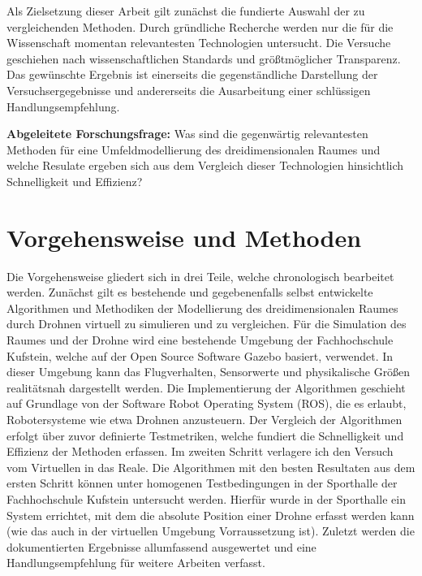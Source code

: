 Als Zielsetzung dieser Arbeit gilt zunächst die fundierte Auswahl der zu vergleichenden Methoden. Durch gründliche Recherche werden nur die für die Wissenschaft momentan relevantesten Technologien untersucht. Die Versuche geschiehen nach wissenschaftlichen Standards und größtmöglicher Transparenz. \newline
Das gewünschte Ergebnis ist einerseits die gegenständliche Darstellung der Versuchsergegebnisse und andererseits die Ausarbeitung einer schlüssigen Handlungsempfehlung. 

    \textbf{Abgeleitete Forschungsfrage:} Was sind die gegenwärtig relevantesten Methoden für eine Umfeldmodellierung des dreidimensionalen Raumes und welche Resulate ergeben sich aus dem Vergleich dieser Technologien hinsichtlich Schnelligkeit und Effizienz?



    \section{Vorgehensweise und Methoden}

Die Vorgehensweise gliedert sich in drei Teile, welche chronologisch bearbeitet werden. \newline
Zunächst gilt es bestehende und gegebenenfalls selbst entwickelte Algorithmen und Methodiken der Modellierung des dreidimensionalen Raumes durch Drohnen virtuell zu simulieren und zu vergleichen. Für die Simulation des Raumes und der Drohne wird eine bestehende Umgebung der Fachhochschule Kufstein, welche auf der Open Source Software Gazebo basiert, verwendet. In dieser Umgebung kann das Flugverhalten, Sensorwerte und physikalische Größen realitätsnah dargestellt werden. Die Implementierung der Algorithmen geschieht auf Grundlage von der Software Robot Operating System (ROS), die es erlaubt, Robotersysteme wie etwa Drohnen anzusteuern. Der Vergleich der Algorithmen erfolgt über zuvor definierte Testmetriken, welche fundiert die Schnelligkeit und Effizienz der Methoden erfassen. \newline
Im zweiten Schritt verlagere ich den Versuch vom Virtuellen in das Reale. Die Algorithmen mit den besten Resultaten aus dem ersten Schritt können unter homogenen Testbedingungen in der Sporthalle der Fachhochschule Kufstein untersucht werden. Hierfür wurde in der Sporthalle ein System errichtet, mit dem die absolute Position einer Drohne erfasst werden kann (wie das auch in der virtuellen Umgebung Vorraussetzung ist). \newline
Zuletzt werden die dokumentierten Ergebnisse allumfassend ausgewertet und eine Handlungsempfehlung für weitere Arbeiten verfasst. 


